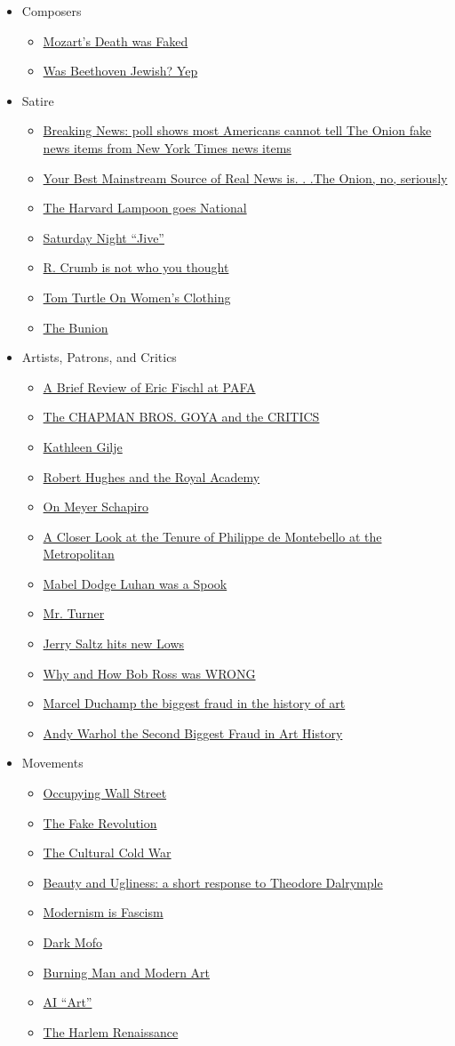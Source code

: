 \documentclass{article}
\newcommand{\insertmydocument}[2]{ %
  \item \href{http://www.mileswmathis.com/#2}{#1}
}
\begin{document}
\begin{itemize}
\begin{itemize}
    \item Composers
    \begin{itemize}

      \insertmydocument{Mozart's Death was Faked}{mozart.pdf}
      \insertmydocument{Was Beethoven Jewish? Yep}{beethoven.pdf}
    \end{itemize}

    \item Satire
    \begin{itemize}

      \insertmydocument{Breaking News: poll shows most Americans cannot tell The Onion fake news items from New York Times news items}{relnews.pdf}
      \insertmydocument{Your Best Mainstream Source of Real News is. . .The Onion, no, seriously}{onion.pdf}
      \insertmydocument{The Harvard Lampoon goes National}{natlam.pdf}
      \insertmydocument{Saturday Night “Jive”}{SNL2.pdf}
      \insertmydocument{R. Crumb is not who you thought}{crumb.pdf}
      \insertmydocument{Tom Turtle On Women's Clothing}{tom8.pdf}
      \insertmydocument{The Bunion}{anni.pdf}
    \end{itemize}

    \item Artists, Patrons, and Critics
    \begin{itemize}

      \insertmydocument{A Brief Review of Eric Fischl at PAFA}{fischl.pdf}
      \insertmydocument{The CHAPMAN BROS. GOYA and the CRITICS}{chapman.pdf}
      \insertmydocument{Kathleen Gilje}{gilje.pdf}
      \insertmydocument{Robert Hughes and the Royal Academy}{hughes.pdf}
      \insertmydocument{On Meyer Schapiro}{meyer.pdf}
      \insertmydocument{A Closer Look at the Tenure of Philippe de Montebello at the Metropolitan}{monte.pdf}
      \insertmydocument{Mabel Dodge Luhan was a Spook}{mabel.pdf}
      \insertmydocument{Mr. Turner}{leigh.pdf}
      \insertmydocument{Jerry Saltz hits new Lows}{saltz2.pdf}
      \insertmydocument{Why and How Bob Ross was WRONG}{ross.pdf}
      \insertmydocument{Marcel Duchamp the biggest fraud in the history of art}{duchamp.pdf}
      \insertmydocument{Andy Warhol the Second Biggest Fraud in Art History}{warhol.pdf}
    \end{itemize}

    \item Movements
    \begin{itemize}

      \insertmydocument{Occupying Wall Street}{ows.pdf}
      \insertmydocument{The Fake Revolution}{blm2.pdf}
      \insertmydocument{The Cultural Cold War}{stoner.pdf}
      \insertmydocument{Beauty and Ugliness: a short response to Theodore Dalrymple}{ugly.pdf}
      \insertmydocument{Modernism is Fascism}{nonude.pdf}
      \insertmydocument{Dark Mofo}{mofo.pdf}
      \insertmydocument{Burning Man and Modern Art}{burn.pdf}
      \insertmydocument{AI “Art”}{renman.pdf}
      \insertmydocument{The Harlem Renaissance}{harlem.pdf}
    \end{itemize}


\end{itemize}
\end{itemize}
\end{document}
